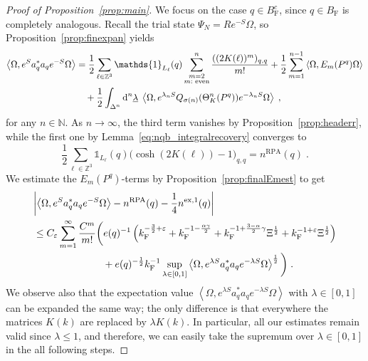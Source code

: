 \documentclass[12pt,a4paper]{article}
\numberwithin{equation}{section}
\newcommand{\1}{\mathbb{I}}
\newcommand{\di}{\textnormal{d}}
\newcommand{\ex}{\mathrm{ex}}
\newcommand{\F}{\mathrm{F}}
\newcommand{\RPA}{\mathrm{RPA}}
\newcommand{\kF}{k_\F}
\newcommand{\Zstar}{\mathbb{Z}^3} %
\newcommand{\N}{\mathbb{N}}
\newcommand{\Z}{\mathbb{Z}}
\newcommand{\half}{\frac{1}{2}}
\newcommand{\eva}[1]{\left\langle #1 \right\rangle}
\theoremstyle{plain}
\theoremstyle{definition}
\theoremstyle{remark}
\theoremstyle{plain}
\theoremstyle{definition}
\theoremstyle{remark}
\begin{document}
\begin{proof}[Proof of Proposition~\ref{prop:main}]
We focus on the case $ q \in B_{\F}^c $, since $ q \in B_{\F} $ is completely analogous. Recall the trial state $ \Psi_N = R e^{-S} \Omega $, so Proposition~\ref{prop:finexpan} yields
\begin{align*}
	\eva{\Omega, e^{S} a_q^* a_q e^{-S} \Omega} 
	&= \half\sum_{\ell\in \Zstar}\mathds{1}_{L_\ell}(q) \sum_{\substack{m=2\\m:\textnormal{ even}}}^n \frac{((2K(\ell))^m)_{q,q}}{m!}
		+ \half \sum_{m=1}^{n-1} \eva{\Omega, E_m(P^q)\Omega}\nonumber\\
	&\quad +\half \int_{\Delta^n} \di^n\underline{\lambda} \;
		\eva{\Omega, e^{\lambda_n S}Q_{\sigma(n)}(\Theta^n_{K}(P^q)) e^{-\lambda_n S} \Omega} \;,
\end{align*}
for any $ n \in \N $. As $ n \to \infty $, the third term vanishes by Proposition~\ref{prop:headerr}, while the first one by Lemma~\ref{eq:nqb_integralrecovery} converges to
\begin{equation*}
	\half\sum_{\ell\in \Zstar}\mathds{1}_{L_\ell}(q) \big( \cosh(2K(\ell)) - 1 \big)_{q,q}
	= n^{\RPA}(q) \;.
\end{equation*}
We estimate the $ E_m(P^q) $-terms by Proposition~\ref{prop:finalEmest} to get
\begin{align} \label{eq:main_errorbound_with_Xi}
	& \abs{\eva{\Omega, e^{S} a_q^* a_q e^{-S} \Omega} - n^{\textnormal{RPA}}(q) - \frac{1}{4} n^{\ex,1}(q) } \nonumber\\
	&\le C_\varepsilon \sum_{m=1}^\infty \frac{C^m}{m!}
		\bigg( e(q)^{-1}\left( \kF^{-\frac 32 + \varepsilon}
		+ \kF^{-1 - \frac{\alpha \gamma}{2}}
		+ \kF^{-1 + \frac{3-\alpha}{2} \gamma} \Xi^\half
		+ \kF^{-1+\varepsilon} \Xi^\half \right) \nonumber\\
	&\hspace{7em} + e(q)^{-\half} \kF^{-1} \sup_{\lambda \in [0,1]} \eva{\Omega, e^{\lambda S} a_q^* a_q e^{-\lambda S} \Omega}^{\half} \bigg) \;.
\end{align}
We observe also that the expectation value $\eva{\Omega, e^{\lambda S} a_q^* a_q e^{-\lambda S} \Omega}$ with $\lambda \in [0,1]$ can be expanded the same way; the only difference is that everywhere the matrices $K(k)$ are replaced by $\lambda K(k)$. In particular, all our estimates remain valid since $\lambda \leq 1$, and therefore, we can easily take the supremum over $\lambda \in [0,1]$ in the all following steps.

\end{proof}
\end{document}
